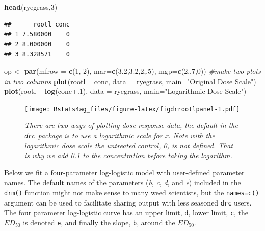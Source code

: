 \documentclass[letterpaper,]{book}
\newenvironment{Shaded}{\begin{snugshade}}{\end{snugshade}}
\newcommand{\CommentTok}[1]{\textcolor[rgb]{0.56,0.35,0.01}{\textit{#1}}}
\newcommand{\DataTypeTok}[1]{\textcolor[rgb]{0.13,0.29,0.53}{#1}}
\newcommand{\DecValTok}[1]{\textcolor[rgb]{0.00,0.00,0.81}{#1}}
\newcommand{\FloatTok}[1]{\textcolor[rgb]{0.00,0.00,0.81}{#1}}
\newcommand{\KeywordTok}[1]{\textcolor[rgb]{0.13,0.29,0.53}{\textbf{#1}}}
\newcommand{\NormalTok}[1]{#1}
\newcommand{\OperatorTok}[1]{\textcolor[rgb]{0.81,0.36,0.00}{\textbf{#1}}}
\newcommand{\StringTok}[1]{\textcolor[rgb]{0.31,0.60,0.02}{#1}}
\begin{document}
\begin{Shaded}
\begin{Highlighting}[]
\KeywordTok{head}\NormalTok{(ryegrass,}\DecValTok{3}\NormalTok{) }
\end{Highlighting}
\end{Shaded}

\begin{verbatim}
##      rootl conc
## 1 7.580000    0
## 2 8.000000    0
## 3 8.328571    0
\end{verbatim}

\begin{Shaded}
\begin{Highlighting}[]
\NormalTok{op <-}\StringTok{ }\KeywordTok{par}\NormalTok{(}\DataTypeTok{mfrow =} \KeywordTok{c}\NormalTok{(}\DecValTok{1}\NormalTok{, }\DecValTok{2}\NormalTok{), }\DataTypeTok{mar=}\KeywordTok{c}\NormalTok{(}\FloatTok{3.2}\NormalTok{,}\FloatTok{3.2}\NormalTok{,}\DecValTok{2}\NormalTok{,.}\DecValTok{5}\NormalTok{), }\DataTypeTok{mgp=}\KeywordTok{c}\NormalTok{(}\DecValTok{2}\NormalTok{,.}\DecValTok{7}\NormalTok{,}\DecValTok{0}\NormalTok{)) }\CommentTok{#make two plots in two columns }
\KeywordTok{plot}\NormalTok{(rootl }\OperatorTok{~}\StringTok{ }\NormalTok{conc, }\DataTypeTok{data =}\NormalTok{ ryegrass, }\DataTypeTok{main=}\StringTok{"Original Dose Scale"}\NormalTok{)}
\KeywordTok{plot}\NormalTok{(rootl }\OperatorTok{~}\StringTok{ }\KeywordTok{log}\NormalTok{(conc}\FloatTok{+.1}\NormalTok{), }\DataTypeTok{data =}\NormalTok{ ryegrass, }\DataTypeTok{main=}\StringTok{"Logarithmic Dose Scale"}\NormalTok{)}
\end{Highlighting}
\end{Shaded}

\begin{figure}
\centering
\texttt{[image: Rstats4ag\_files/figure-latex/figdrrootlpanel-1.pdf]}
\caption{\label{fig:figdrrootlpanel}\emph{There are two ways of plotting dose-response data, the default in the \texttt{drc} package is to use a logarithmic scale for x. Note with the logarithmic dose scale the untreated control, 0, is not defined. That is why we add 0.1 to the concentration before taking the logarithm.}}
\end{figure}

Below we fit a four-parameter log-logistic model with user-defined parameter names. The default names of the parameters (\emph{b}, \emph{c}, \emph{d}, and \emph{e}) included in the \texttt{drm()} function might not make sense to many weed scientists, but the \texttt{names=c()} argument can be used to facilitate sharing output with less seasoned \texttt{drc} users. The four parameter log-logistic curve has an upper limit, \texttt{d}, lower limit, \texttt{c}, the \(ED_{50}\) is denoted \texttt{e}, and finally the slope, \texttt{b}, around the \(ED_{50}\).
\end{document}
